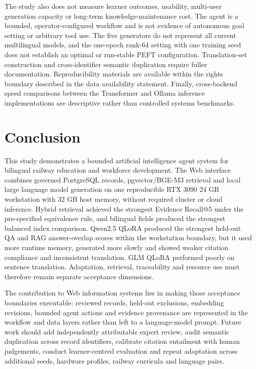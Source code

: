 The study also does not measure learner outcomes, usability, multi-user generation capacity or long-term knowledge-maintenance cost. The agent is a bounded, operator-configured workflow and is not evidence of autonomous goal setting or arbitrary tool use. The five generators do not represent all current multilingual models, and the one-epoch rank-64 setting with one training seed does not establish an optimal or run-stable PEFT configuration. Translation-set construction and cross-identifier semantic duplication require fuller documentation. Reproducibility materials are available within the rights boundary described in the data availability statement. Finally, cross-backend speed comparisons between the Transformer and Ollama inference implementations are descriptive rather than controlled systems benchmarks.

\section{Conclusion}

This study demonstrates a bounded artificial intelligence agent system for bilingual railway education and workforce development. The Web interface combines governed PostgreSQL records, pgvector/BGE-M3 retrieval and local large language model generation on one reproducible RTX 3090 24 GB workstation with 32 GB host memory, without required cluster or cloud inference. Hybrid retrieval achieved the strongest Evidence Recall@5 under the pre-specified equivalence rule, and bilingual fields produced the strongest balanced index comparison. Qwen2.5 QLoRA produced the strongest held-out QA and RAG answer-overlap scores within the workstation boundary, but it used more runtime memory, generated more slowly and showed weaker citation compliance and inconsistent translation. GLM QLoRA performed poorly on sentence translation. Adaptation, retrieval, traceability and resource use must therefore remain separate acceptance dimensions.

The contribution to Web information systems lies in making those acceptance boundaries executable: reviewed records, held-out exclusions, embedding revisions, bounded agent actions and evidence provenance are represented in the workflow and data layers rather than left to a language-model prompt. Future work should add independently attributable expert review, audit semantic duplication across record identifiers, calibrate citation entailment with human judgements, conduct learner-centred evaluation and repeat adaptation across additional seeds, hardware profiles, railway curricula and language pairs.

